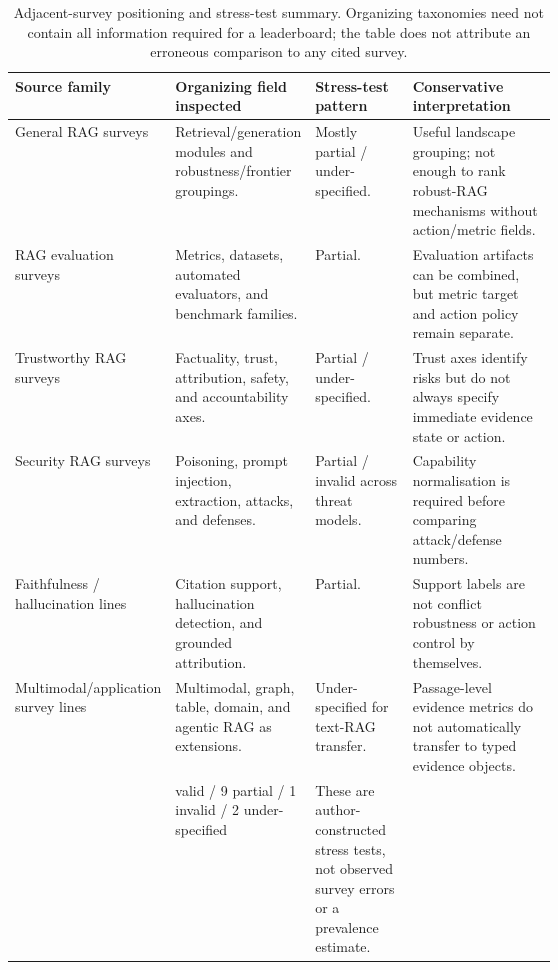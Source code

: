 \begin{table}[t]
\centering
\scriptsize
\renewcommand{\arraystretch}{0.9}
\begin{tabularx}{\linewidth}{>{\raggedright\arraybackslash}p{0.23\linewidth}>{\raggedright\arraybackslash}p{0.22\linewidth}>{\raggedright\arraybackslash}p{0.18\linewidth}X}
\toprule
\textbf{Source family} & \textbf{Organizing field inspected} & \textbf{Stress-test pattern} & \textbf{Conservative interpretation} \\
\midrule
General RAG surveys & Retrieval/generation modules and robustness/frontier groupings. & Mostly partial / under-specified. & Useful landscape grouping; not enough to rank robust-RAG mechanisms without action/metric fields. \\
RAG evaluation surveys & Metrics, datasets, automated evaluators, and benchmark families. & Partial. & Evaluation artifacts can be combined, but metric target and action policy remain separate. \\
Trustworthy RAG surveys & Factuality, trust, attribution, safety, and accountability axes. & Partial / under-specified. & Trust axes identify risks but do not always specify immediate evidence state or action. \\
Security RAG surveys & Poisoning, prompt injection, extraction, attacks, and defenses. & Partial / invalid across threat models. & Capability normalisation is required before comparing attack/defense numbers. \\
Faithfulness / hallucination lines & Citation support, hallucination detection, and grounded attribution. & Partial. & Support labels are not conflict robustness or action control by themselves. \\
Multimodal/application survey lines & Multimodal, graph, table, domain, and agentic RAG as extensions. & Under-specified for text-RAG transfer. & Passage-level evidence metrics do not automatically transfer to typed evidence objects. \\
\midrule
\multicolumn{2}{l}{Twelve organizing claims used to construct hypothetical comparisons} & 0 valid / 9 partial / 1 invalid / 2 under-specified & These are author-constructed stress tests, not observed survey errors or a prevalence estimate. \\
\bottomrule
\end{tabularx}
\caption{Adjacent-survey positioning and stress-test summary. Organizing taxonomies need not contain all information required for a leaderboard; the table does not attribute an erroneous comparison to any cited survey.}
\label{tab:prior-survey-claim-audit-summary}
\end{table}
